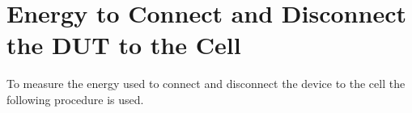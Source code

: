%
%
%

\section{Energy to Connect and Disconnect the DUT to the Cell} \label{sec:performance_attach}

To measure the energy used to connect and disconnect the device to the cell the following procedure is used.





